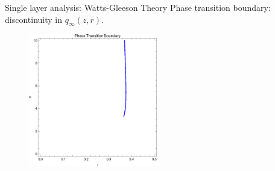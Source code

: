 \documentclass[10pt, xcolor=dvipsnames]{beamer}
\begin{document}
\begin{frame}{Single layer analysis: Watts-Gleeson Theory}
Phase transition boundary: discontinuity in $q_\infty(z,r)$.
\begin{figure}
\centering
\includegraphics[width=0.5\textwidth]{figures/single_layer_cascade}
\end{figure}
\end{frame}
\end{document}
